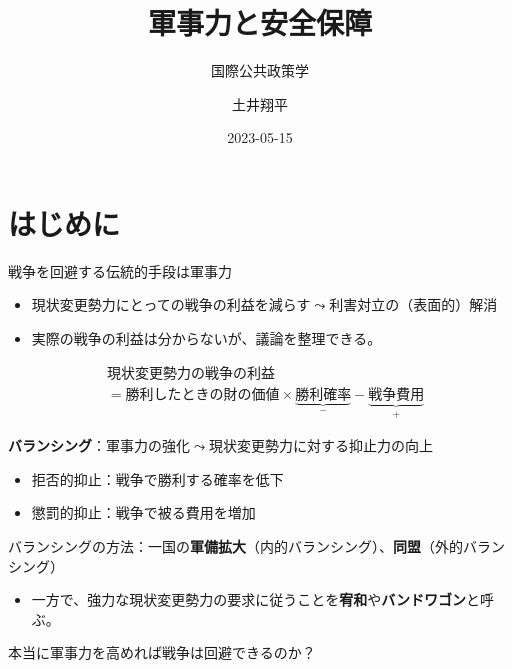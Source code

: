 \documentclass[
  xelatex,
  ja=standard]{bxjsarticle}
\title{軍事力と安全保障}
\subtitle{国際公共政策学}
\author{土井翔平}
\date{2023-05-15}
\providecommand{\tightlist}{%
  \setlength{\itemsep}{0pt}\setlength{\parskip}{0pt}}\usepackage{longtable,booktabs,array}
\begin{document}
\maketitle
\ifdefined\Shaded\renewenvironment{Shaded}{\begin{tcolorbox}[enhanced, breakable, borderline west={3pt}{0pt}{shadecolor}, boxrule=0pt, sharp corners, interior hidden, frame hidden]}{\end{tcolorbox}}\fi

\hypertarget{ux306fux3058ux3081ux306b}{%
\section*{はじめに}\label{ux306fux3058ux3081ux306b}}

戦争を回避する伝統的手段は軍事力

\begin{itemize}
\tightlist
\item
  現状変更勢力にとっての戦争の利益を減らす\(\leadsto\)利害対立の（表面的）解消
\item
  実際の戦争の利益は分からないが、議論を整理できる。
\end{itemize}

\[
\begin{split}
&\textrm{現状変更勢力の戦争の利益} \\
&= \textrm{勝利したときの財の価値} \times \underbrace{\textrm{勝利確率}}_{-} - \underbrace{\textrm{戦争費用}}_{+}
\end{split}
\]

\textbf{バランシング}：軍事力の強化\(\leadsto\)現状変更勢力に対する抑止力の向上

\begin{itemize}
\tightlist
\item
  拒否的抑止：戦争で勝利する確率を低下
\item
  懲罰的抑止：戦争で被る費用を増加
\end{itemize}

バランシングの方法：一国の\textbf{軍備拡大}（内的バランシング）、\textbf{同盟}（外的バランシング）

\begin{itemize}
\tightlist
\item
  一方で、強力な現状変更勢力の要求に従うことを\textbf{宥和}や\textbf{バンドワゴン}と呼ぶ\citep{schweller1994}。
\end{itemize}

本当に軍事力を高めれば戦争は回避できるのか？
\end{document}
